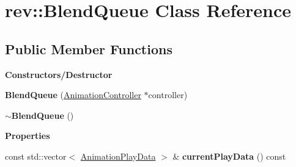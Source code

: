 \hypertarget{classrev_1_1_blend_queue}{}\section{rev\+::Blend\+Queue Class Reference}
\label{classrev_1_1_blend_queue}
\subsection*{Public Member Functions}
\begin{Indent}\textbf{ Constructors/\+Destructor}\par
\begin{DoxyCompactItemize}
\item 
\mbox{\label{classrev_1_1_blend_queue_a0e7746dfe67c7131ce729cf96297e0ca}} 
{\bfseries Blend\+Queue} (\mbox{\hyperlink{classrev_1_1_animation_controller}{Animation\+Controller}} $\ast$controller)
\item 
\mbox{\label{classrev_1_1_blend_queue_a0eaf86679bcc68c264b250eb9f499cdf}} 
{\bfseries $\sim$\+Blend\+Queue} ()
\end{DoxyCompactItemize}
\end{Indent}
\begin{Indent}\textbf{ Properties}\par
\begin{DoxyCompactItemize}
\item 
\mbox{\label{classrev_1_1_blend_queue_a2a2500d3700ca474c7b32d3b6b05a2f5}} 
const std\+::vector$<$ \mbox{\hyperlink{structrev_1_1_animation_play_data}{Animation\+Play\+Data}} $>$ \& {\bfseries current\+Play\+Data} () const
\end{DoxyCompactItemize}
\end{Indent}
